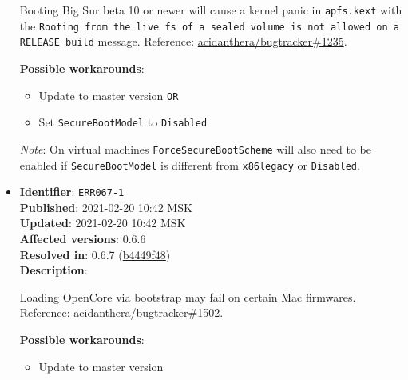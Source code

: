 \documentclass[]{article}
\providecommand{\tightlist}{%
  \setlength{\itemsep}{0pt}\setlength{\parskip}{0pt}}
\begin{document}
\begin{itemize}
  Booting Big Sur beta 10 or newer will cause a kernel panic in \texttt{apfs.kext} with the
  \texttt{Rooting from the live fs of a sealed volume is not allowed on a RELEASE build}
  message. Reference:
  \href{https://github.com/acidanthera/bugtracker/issues/1235}{acidanthera/bugtracker\#1235}.

  \textbf{Possible workarounds}:
  \begin{itemize}
    \tightlist

    \item Update to master version \texttt{OR}
    \item Set \texttt{SecureBootModel} to \texttt{Disabled}

  \end{itemize}

  \emph{Note}: On virtual machines \texttt{ForceSecureBootScheme} will also need
  to be enabled if \texttt{SecureBootModel} is different from \texttt{x86legacy}
  or \texttt{Disabled}.

\item
  \textbf{Identifier}: \texttt{ERR067-1} \\
  \textbf{Published}: 2021-02-20 10:42 MSK \\
  \textbf{Updated}: 2021-02-20 10:42 MSK \\
  \textbf{Affected versions}: 0.6.6 \\
  \textbf{Resolved in}: 0.6.7 (\href{https://github.com/acidanthera/OpenCorePkg/commit/b4449f48dd01703b5766352b6f29717415aff08b}{b4449f48}) \\
  \textbf{Description}:

  Loading OpenCore via bootstrap may fail on certain Mac firmwares. Reference:
  \href{https://github.com/acidanthera/bugtracker/issues/1502}{acidanthera/bugtracker\#1502}.

  \textbf{Possible workarounds}:
  \begin{itemize}
    \tightlist

    \item Update to master version

  \end{itemize}

\end{itemize}
\end{document}
